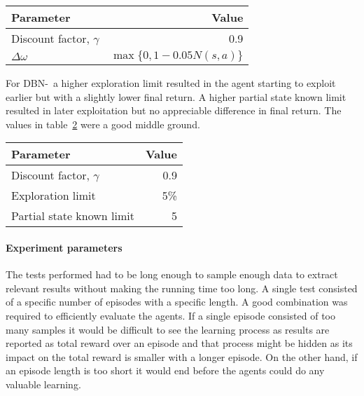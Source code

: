 \begin{table}[H]
    \centering
    \label{tab:mbie_realistic_params}
    \begin{tabular}{lr}
     \toprule
     Parameter & Value \\
     \midrule
     Discount factor, $\gamma$ & 0.9 \\
     $\Delta \omega$ & $\max\{0,1 - 0.05 N(s,a)\}$ \\
     \bottomrule
    \end{tabular}
\end{table}

For DBN-\etre\ a higher exploration limit resulted in the agent starting to
exploit earlier but with a slightly lower final return. A higher partial state
known limit resulted in later exploitation but no appreciable difference in
final return. The values in table~\ref{tab:dbne3_params} were a good middle
ground.

\begin{table}[H]
\label{tab:dbne3_params}
\centering
\begin{tabular}{lr}
 \toprule
 Parameter & Value \\
 \midrule
 Discount factor, $\gamma$ & 0.9 \\
 Exploration limit & 5\% \\
 Partial state known limit & 5 \\
 \bottomrule
\end{tabular}
\end{table}

\paragraph{Experiment parameters}

The tests performed had to be long enough to sample enough data to extract
relevant results without making the running time too long. A single test
consisted of a specific number of episodes with a specific length. A good
combination was required to efficiently evaluate the agents. If a single
episode consisted of too many samples it would be difficult to see the learning
process as results are reported as total reward over an episode and that
process might be hidden as its impact on the total reward is smaller with a
longer episode. On the other hand, if an episode length is too short it would
end before the agents could do any valuable learning.

